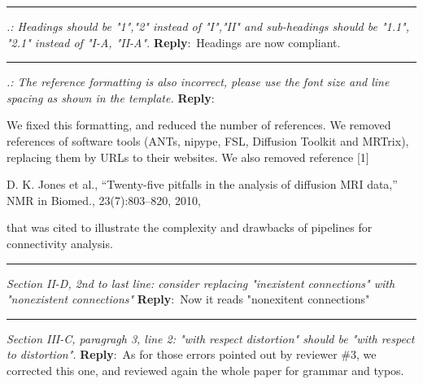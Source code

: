 \documentclass[letter]{memoir}
\newcommand{\pointRaised}[2]{\medskip \hrule \noindent 
               \textsl{{\fontseries{b}\selectfont #1}: #2}}
\newcommand{\reply}{\noindent \textbf{Reply}:\ }
\begin{document}
\pointRaised{1.}{Headings should be "1","2" instead of "I","II" and
  sub-headings should be "1.1", "2.1" instead of "I-A,
  "II-A".}
\reply{Headings are now compliant.}
\pointRaised{2.}{The reference formatting is also incorrect, please use
  the font size and line spacing as shown in the template.}
\reply{We fixed this formatting, and reduced the number of references.
  We removed references of software tools (ANTs, nipype, FSL, Diffusion Toolkit
  and MRTrix), replacing them by URLs to their websites.
  We also removed reference [1]
  
  D. K. Jones et al., “Twenty-ﬁve pitfalls in the analysis of diffusion MRI data,” NMR in Biomed., 23(7):803–820,
  2010,
  
  that was cited to illustrate the complexity and drawbacks of pipelines for connectivity analysis.}
  
\pointRaised{Section II-D, 2nd to last line}{consider replacing
  "inexistent connections" with "nonexistent connections"}
\reply{Now it reads "nonexitent connections"}
\pointRaised{Section III-C, paragragh 3, line 2}{"with respect
  distortion" should be "with respect to distortion".}
\reply{As for those errors pointed out by reviewer \#3, we corrected
this one, and reviewed again the whole paper for grammar and typos.}
\end{document}
